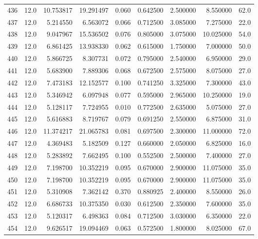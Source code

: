 \begin{tabular}{lrrrrrrrr}
436  &   12.0 &  10.753817 &  19.291497 &  0.060 &  0.642500 &  2.500000 &   8.550000 &   62.0 \\
437  &   12.0 &   5.214550 &   6.563072 &  0.066 &  0.712500 &  3.085000 &   7.275000 &   22.0 \\
438  &   12.0 &   9.047967 &  15.536502 &  0.076 &  0.805000 &  3.075000 &  10.025000 &   54.0 \\
439  &   12.0 &   6.861425 &  13.938330 &  0.062 &  0.615000 &  1.750000 &   7.000000 &   50.0 \\
440  &   12.0 &   5.866725 &   8.307731 &  0.072 &  0.795000 &  2.540000 &   6.950000 &   29.0 \\
441  &   12.0 &   5.683900 &   7.889306 &  0.068 &  0.672500 &  2.575000 &   8.075000 &   27.0 \\
442  &   12.0 &   7.473183 &  12.152577 &  0.100 &  0.741250 &  3.325000 &   7.300000 &   43.0 \\
443  &   12.0 &   5.346942 &   6.097948 &  0.077 &  0.595000 &  2.965000 &  10.250000 &   19.0 \\
444  &   12.0 &   5.128117 &   7.724955 &  0.010 &  0.772500 &  2.635000 &   5.075000 &   27.0 \\
445  &   12.0 &   5.616883 &   8.719767 &  0.079 &  0.691250 &  2.550000 &   6.875000 &   31.0 \\
446  &   12.0 &  11.374217 &  21.065783 &  0.081 &  0.697500 &  2.300000 &  11.000000 &   72.0 \\
447  &   12.0 &   4.369483 &   5.182509 &  0.127 &  0.660000 &  2.050000 &   6.825000 &   16.0 \\
448  &   12.0 &   5.283892 &   7.662495 &  0.100 &  0.552500 &  2.500000 &   7.400000 &   27.0 \\
449  &   12.0 &   7.198700 &  10.352219 &  0.095 &  0.670000 &  2.900000 &  11.075000 &   35.0 \\
450  &   12.0 &   7.198700 &  10.352219 &  0.095 &  0.670000 &  2.900000 &  11.075000 &   35.0 \\
451  &   12.0 &   5.310908 &   7.362142 &  0.370 &  0.880925 &  2.400000 &   8.550000 &   26.0 \\
452  &   12.0 &   6.686733 &  10.375350 &  0.030 &  0.612500 &  2.350000 &   7.600000 &   35.0 \\
453  &   12.0 &   5.120317 &   6.498363 &  0.084 &  0.712500 &  3.030000 &   6.350000 &   22.0 \\
454  &   12.0 &   9.626517 &  19.094469 &  0.063 &  0.572500 &  1.800000 &   8.025000 &   67.0 \\

\end{tabular}
